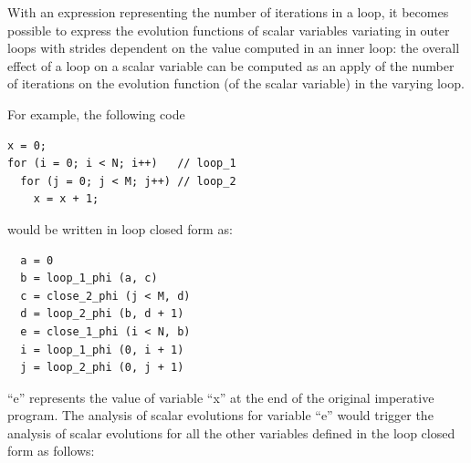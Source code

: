 With an expression representing the number of iterations in a loop, it
becomes possible to express the evolution functions of scalar
variables variating in outer loops with strides dependent on the value
computed in an inner loop: the overall effect of a loop on a scalar
variable can be computed as an apply of the number of iterations on
the evolution function (of the scalar variable) in the varying loop.

For example, the following code
\begin{verbatim}
x = 0;
for (i = 0; i < N; i++)   // loop_1
  for (j = 0; j < M; j++) // loop_2
    x = x + 1;
\end{verbatim}
would be written in loop closed \SSA{} form as:
\begin{verbatim}
  a = 0
  b = loop_1_phi (a, c)
  c = close_2_phi (j < M, d)
  d = loop_2_phi (b, d + 1)
  e = close_1_phi (i < N, b)
  i = loop_1_phi (0, i + 1)
  j = loop_2_phi (0, j + 1)
\end{verbatim}
``e'' represents the value of variable ``x'' at the end of the
original imperative program.  The analysis of scalar evolutions for
variable ``e'' would trigger the analysis of scalar evolutions for all
the other variables defined in the loop closed \SSA{} form as follows:
